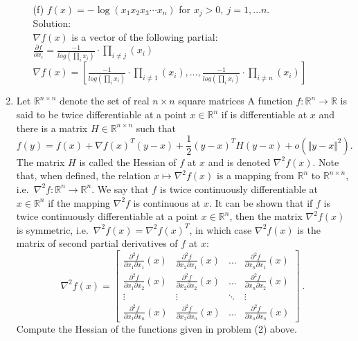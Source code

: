 \documentclass[12pt]{amsart}
\newcommand{\norm}[1]{\Vert #1 \Vert}
\newcommand{\Rn}{\R^n}
\newcommand{\R}{{\mathbb{R}}}
\newcommand{\grad}{\nabla}
\newcommand{\Rnn}{\R^{n\times n}}
\newcommand{\map}[3]{#1:#2\rightarrow #3}
\newcommand{\half}{\frac{1}{2}}
\begin{document}
\begin{enumerate}
\begin{enumerate}
\item[(f)] $f(x)=-\log(x_1x_2x_3\cdots x_n)$ for $x_j>0,\ j=1,\dots n$.\\

\noindent
Solution:\\
$\grad f(x)$ is a vector of the following partial: \\
$\displaystyle \frac{\partial f}{\partial x_i} = \frac{-1}{log (\prod_i x_i)} \cdot \prod_{i \neq j} (x_i)$\\
$\displaystyle \grad f(x) = [\frac{-1}{log (\prod_i x_i)} \cdot \prod_{i \neq 1} (x_i), \ldots, \frac{-1}{log (\prod_i x_i)} \cdot \prod_{i \neq n} (x_i)]$\\

\end{enumerate}




\item
Let $\Rnn$ denote the set of real $n\times n$ square matrices
A function $\map{f}{\Rn}{\R}$ is said to be twice differentiable at a point $x\in\Rn$
if is differentiable at $x$ and there is a matrix $H\in\Rnn$ such that
$$f(y)=f(x)+\grad f(x)^T(y-x)+\half (y-x)^TH(y-x)+ o(\norm{y-x}^2).$$
The matrix $H$ is called the Hessian of $f$ at $x$ and is denoted $\grad^2f(x)$.
Note that, when defined, the relation $x\mapsto \grad^2 f(x)$ is
a mapping from $\Rn$ to $\Rnn$, i.e.~$\map{\grad^2 f}{\Rn}{\Rn}$.
We say that $f$ is twice continuously differentiable at $x\in\Rn$ if the mapping
$\grad^2 f$ is continuous at $x$. It can be shown that if $f$ is twice
continuously differentiable at a point $x\in\Rn$, then the matrix
$\grad^2f(x)$ is symmetric, i.e.~$\grad^2f(x)=\grad^2f(x)^T$, in which case
$\grad^2 f(x)$ is the matrix of second partial derivatives of $f$ at $x$:
$$
\grad^2f(x)=\left[\begin{array}{cccc}
\frac{\partial^2 f}{\partial x_1\partial x_1}(x)&
\frac{\partial^2 f}{\partial x_2\partial x_1}(x)&\dots&
\frac{\partial^2 f}{\partial x_n\partial x_1}(x)\\
\frac{\partial^2 f}{\partial x_1\partial x_2}(x)&
\frac{\partial^2 f}{\partial x_2\partial x_2}(x)&\dots&
\frac{\partial^2 f}{\partial x_n\partial x_2}(x)\\
\vdots&\vdots&\ddots&\vdots\\
\frac{\partial^2 f}{\partial x_1\partial x_n}(x)&
\frac{\partial^2 f}{\partial x_2\partial x_n}(x)&\dots&
\frac{\partial^2 f}{\partial x_n\partial x_n}(x)
\end{array}\right]\ .
$$
Compute the Hessian of the functions given in problem (2) above.


\end{enumerate}
\end{document}
